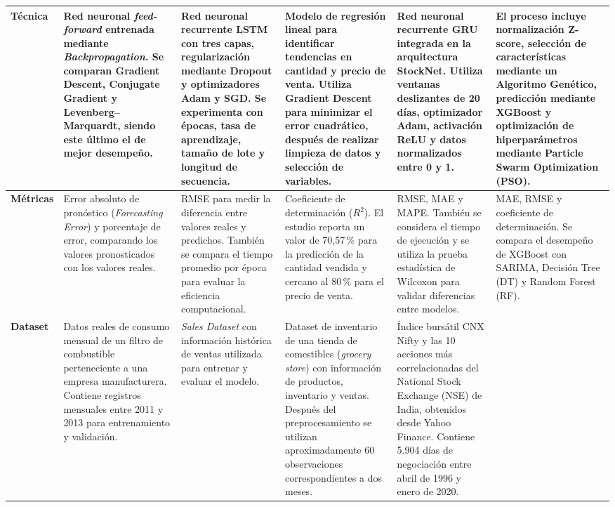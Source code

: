 \begin{table}[H]
{\begin{tabular}{|p{2.5cm}|p{4.5cm}|p{4.5cm}|p{4.5cm}|p{4.5cm}|p{4.5cm}|}
\textbf{Técnica} &
Red neuronal \textit{feed-forward} entrenada mediante \textit{Backpropagation}. Se comparan Gradient Descent, Conjugate Gradient y Levenberg--Marquardt, siendo este último el de mejor desempeño. &
Red neuronal recurrente LSTM con tres capas, regularización mediante Dropout y optimizadores Adam y SGD. Se experimenta con épocas, tasa de aprendizaje, tamaño de lote y longitud de secuencia. &
Modelo de regresión lineal para identificar tendencias en cantidad y precio de venta. Utiliza Gradient Descent para minimizar el error cuadrático, después de realizar limpieza de datos y selección de variables. &
Red neuronal recurrente GRU integrada en la arquitectura StockNet. Utiliza ventanas deslizantes de 20 días, optimizador Adam, activación ReLU y datos normalizados entre 0 y 1. &
El proceso incluye normalización Z-score, selección de características mediante un Algoritmo Genético, predicción mediante XGBoost y optimización de hiperparámetros mediante Particle Swarm Optimization (PSO). \\ 
\hline

\textbf{Métricas} &
Error absoluto de pronóstico (\textit{Forecasting Error}) y porcentaje de error, comparando los valores pronosticados con los valores reales. &
RMSE para medir la diferencia entre valores reales y predichos. También se compara el tiempo promedio por época para evaluar la eficiencia computacional. &
Coeficiente de determinación ($R^2$). El estudio reporta un valor de 70,57\,\% para la predicción de la cantidad vendida y cercano al 80\,\% para el precio de venta. &
RMSE, MAE y MAPE. También se considera el tiempo de ejecución y se utiliza la prueba estadística de Wilcoxon para validar diferencias entre modelos. &
MAE, RMSE y coeficiente de determinación. Se compara el desempeño de XGBoost con SARIMA, Decisión Tree (DT) y Random Forest (RF). \\ 
\hline

\textbf{Dataset} &
Datos reales de consumo mensual de un filtro de combustible perteneciente a una empresa manufacturera. Contiene registros mensuales entre 2011 y 2013 para entrenamiento y validación. &
\textit{Sales Dataset} con información histórica de ventas utilizada para entrenar y evaluar el modelo. &
Dataset de inventario de una tienda de comestibles (\textit{grocery store}) con información de productos, inventario y ventas. Después del preprocesamiento se utilizan aproximadamente 60 observaciones correspondientes a dos meses. &
Índice bursátil CNX Nifty y las 10 acciones más correlacionadas del National Stock Exchange (NSE) de India, obtenidos desde Yahoo Finance. Contiene 5.904 días de negociación entre abril de 1996 y enero de 2020. &


\end{tabular}}
\end{table}
